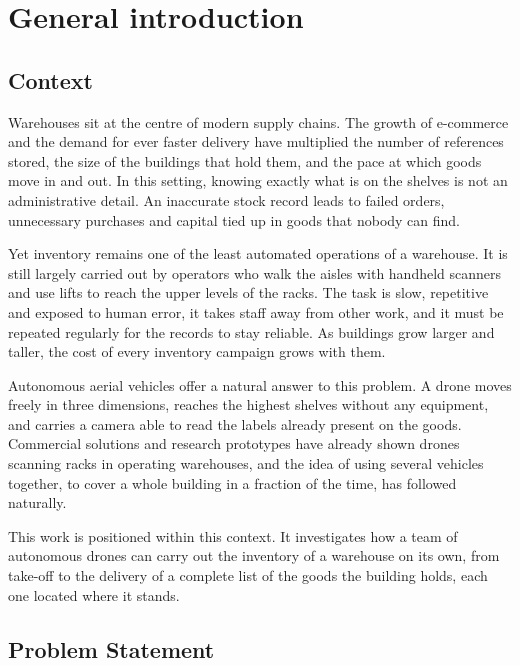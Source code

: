 \chapter*{General introduction}
\label{chap.intro}

\section*{Context}

Warehouses sit at the centre of modern supply chains. The growth of e-commerce
and the demand for ever faster delivery have multiplied the number of references
stored, the size of the buildings that hold them, and the pace at which goods
move in and out. In this setting, knowing exactly what is on the shelves is not
an administrative detail. An inaccurate stock record leads to failed orders,
unnecessary purchases and capital tied up in goods that nobody can find.

Yet inventory remains one of the least automated operations of a warehouse. It is
still largely carried out by operators who walk the aisles with handheld scanners
and use lifts to reach the upper levels of the racks. The task is slow,
repetitive and exposed to human error, it takes staff away from other work, and
it must be repeated regularly for the records to stay reliable. As buildings grow
larger and taller, the cost of every inventory campaign grows with them.

Autonomous aerial vehicles offer a natural answer to this problem. A drone moves
freely in three dimensions, reaches the highest shelves without any equipment,
and carries a camera able to read the labels already present on the goods.
Commercial solutions and research prototypes have already shown drones scanning
racks in operating warehouses, and the idea of using several vehicles together,
to cover a whole building in a fraction of the time, has followed naturally.

This work is positioned within this context. It investigates how a team of
autonomous drones can carry out the inventory of a warehouse on its own, from
take-off to the delivery of a complete list of the goods the building holds, each
one located where it stands.

\section*{Problem Statement}

